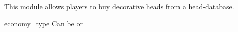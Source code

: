 
This module allows players to buy decorative heads from a head-database.



\begin{Configuration}
    \item[economy\_type]{Can be  or }
\end{Configuration}
